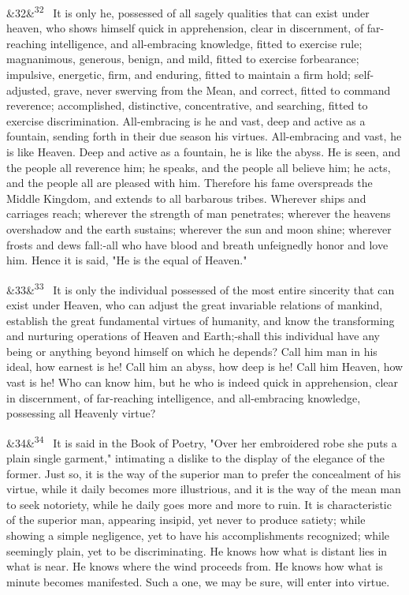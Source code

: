 \documentclass[12pt]{article}
\newcommand{\para}[1][]{\par\noindent\ifx&#1&\else\textsuperscript{\footnotesize #1}~\fi}
\begin{document}
\para[32] It is only he, possessed of all sagely qualities that can exist under heaven, who shows himself quick in apprehension, clear in discernment, of far-reaching intelligence, and all-embracing knowledge, fitted to exercise rule; magnanimous, generous, benign, and mild, fitted to exercise forbearance; impulsive, energetic, firm, and enduring, fitted to maintain a firm hold; self-adjusted, grave, never swerving from the Mean, and correct, fitted to command reverence; accomplished, distinctive, concentrative, and searching, fitted to exercise discrimination. All-embracing is he and vast, deep and active as a fountain, sending forth in their due season his virtues. All-embracing and vast, he is like Heaven. Deep and active as a fountain, he is like the abyss. He is seen, and the people all reverence him; he speaks, and the people all believe him; he acts, and the people all are pleased with him. Therefore his fame overspreads the Middle Kingdom, and extends to all barbarous tribes. Wherever ships and carriages reach; wherever the strength of man penetrates; wherever the heavens overshadow and the earth sustains; wherever the sun and moon shine; wherever frosts and dews fall:-all who have blood and breath unfeignedly honor and love him. Hence it is said, "He is the equal of Heaven."

\para[33] It is only the individual possessed of the most entire sincerity that can exist under Heaven, who can adjust the great invariable relations of mankind, establish the great fundamental virtues of humanity, and know the transforming and nurturing operations of Heaven and Earth;-shall this individual have any being or anything beyond himself on which he depends? Call him man in his ideal, how earnest is he! Call him an abyss, how deep is he! Call him Heaven, how vast is he! Who can know him, but he who is indeed quick in apprehension, clear in discernment, of far-reaching intelligence, and all-embracing knowledge, possessing all Heavenly virtue?

\para[34] It is said in the Book of Poetry, "Over her embroidered robe she puts a plain single garment," intimating a dislike to the display of the elegance of the former. Just so, it is the way of the superior man to prefer the concealment of his virtue, while it daily becomes more illustrious, and it is the way of the mean man to seek notoriety, while he daily goes more and more to ruin. It is characteristic of the superior man, appearing insipid, yet never to produce satiety; while showing a simple negligence, yet to have his accomplishments recognized; while seemingly plain, yet to be discriminating. He knows how what is distant lies in what is near. He knows where the wind proceeds from. He knows how what is minute becomes manifested. Such a one, we may be sure, will enter into virtue.
\end{document}
